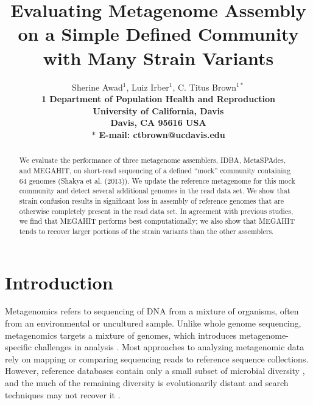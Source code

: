 \documentclass[11pt]{article}
\begin{document}
\title{Evaluating Metagenome Assembly on a Simple Defined Community with Many Strain Variants}

\author{Sherine Awad$^{1}$, Luiz Irber$^{1}$, C. Titus Brown$^{1\ast}$\\
\small
\bf{1} Department of Population Health and Reproduction \\
\small
University of California, Davis\\
\small
Davis, CA 95616 USA\\
\small
$\ast$ E-mail: ctbrown@ucdavis.edu
} 

\maketitle


\begin{abstract}
 
  We evaluate the performance of three metagenome assemblers, IDBA,
  MetaSPAdes, and MEGAHIT, on short-read sequencing of a defined ``mock''
  community containing 64 genomes (Shakya et al. (2013)).  We update
  the reference metagenome for this mock community and detect several
  additional genomes in the read data set.  We show that strain
  confusion results in significant loss in assembly of reference
  genomes that are otherwise completely present in the read data set.
  In agreement with previous studies, we find that MEGAHIT performs
  best computationally; we also show that MEGAHIT tends to recover
  larger portions of the strain variants than the other assemblers.
  
\end{abstract}

\clearpage

\section*{Introduction}

Metagenomics refers to sequencing of DNA from a mixture of organisms,
often from an environmental or uncultured sample. Unlike whole genome
sequencing, metagenomics targets a mixture of genomes, which
introduces metagenome-specific challenges in analysis
\cite{ghurye2016metagenomic}.  Most approaches to analyzing
metagenomic data rely on mapping or comparing sequencing reads to
reference sequence collections. However, reference databases contain
only a small subset of microbial diversity \cite{geba}, and the much
of the remaining diversity is evolutionarily distant and search
techniques may not recover it \cite{CAMI}.
\end{document}
